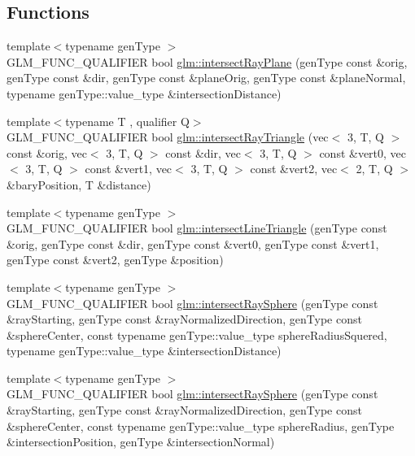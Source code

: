 \subsection*{Functions}
\begin{DoxyCompactItemize}
\item 
{\footnotesize template$<$typename gen\+Type $>$ }\\G\+L\+M\+\_\+\+F\+U\+N\+C\+\_\+\+Q\+U\+A\+L\+I\+F\+I\+ER bool \hyperlink{group__gtx__intersect_gad3697a9700ea379739a667ea02573488}{glm\+::intersect\+Ray\+Plane} (gen\+Type const \&orig, gen\+Type const \&dir, gen\+Type const \&plane\+Orig, gen\+Type const \&plane\+Normal, typename gen\+Type\+::value\+\_\+type \&intersection\+Distance)
\item 
{\footnotesize template$<$typename T , qualifier Q$>$ }\\G\+L\+M\+\_\+\+F\+U\+N\+C\+\_\+\+Q\+U\+A\+L\+I\+F\+I\+ER bool \hyperlink{group__gtx__intersect_ga65bf2c594482f04881c36bc761f9e946}{glm\+::intersect\+Ray\+Triangle} (vec$<$ 3, T, Q $>$ const \&orig, vec$<$ 3, T, Q $>$ const \&dir, vec$<$ 3, T, Q $>$ const \&vert0, vec$<$ 3, T, Q $>$ const \&vert1, vec$<$ 3, T, Q $>$ const \&vert2, vec$<$ 2, T, Q $>$ \&bary\+Position, T \&distance)
\item 
{\footnotesize template$<$typename gen\+Type $>$ }\\G\+L\+M\+\_\+\+F\+U\+N\+C\+\_\+\+Q\+U\+A\+L\+I\+F\+I\+ER bool \hyperlink{group__gtx__intersect_ga9d29b9b3acb504d43986502f42740df4}{glm\+::intersect\+Line\+Triangle} (gen\+Type const \&orig, gen\+Type const \&dir, gen\+Type const \&vert0, gen\+Type const \&vert1, gen\+Type const \&vert2, gen\+Type \&position)
\item 
{\footnotesize template$<$typename gen\+Type $>$ }\\G\+L\+M\+\_\+\+F\+U\+N\+C\+\_\+\+Q\+U\+A\+L\+I\+F\+I\+ER bool \hyperlink{group__gtx__intersect_gac88f8cd84c4bcb5b947d56acbbcfa56e}{glm\+::intersect\+Ray\+Sphere} (gen\+Type const \&ray\+Starting, gen\+Type const \&ray\+Normalized\+Direction, gen\+Type const \&sphere\+Center, const typename gen\+Type\+::value\+\_\+type sphere\+Radius\+Squered, typename gen\+Type\+::value\+\_\+type \&intersection\+Distance)
\item 
{\footnotesize template$<$typename gen\+Type $>$ }\\G\+L\+M\+\_\+\+F\+U\+N\+C\+\_\+\+Q\+U\+A\+L\+I\+F\+I\+ER bool \hyperlink{group__gtx__intersect_gad28c00515b823b579c608aafa1100c1d}{glm\+::intersect\+Ray\+Sphere} (gen\+Type const \&ray\+Starting, gen\+Type const \&ray\+Normalized\+Direction, gen\+Type const \&sphere\+Center, const typename gen\+Type\+::value\+\_\+type sphere\+Radius, gen\+Type \&intersection\+Position, gen\+Type \&intersection\+Normal)

\end{DoxyCompactItemize}
